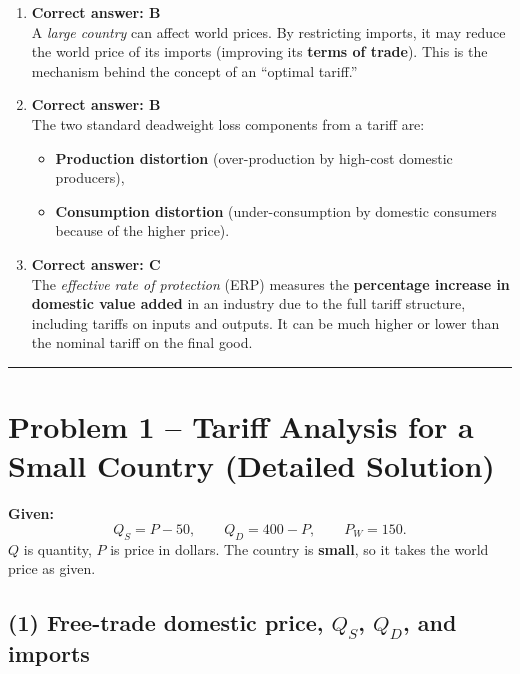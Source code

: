 \documentclass[12pt]{article}
\begin{document}
\begin{enumerate}[label=\textbf{\arabic*.}]
\item \textbf{Correct answer: B} \\
A \textit{large country} can affect world prices. By restricting imports, it may reduce the world price of its imports (improving its \textbf{terms of trade}).  
This is the mechanism behind the concept of an ``optimal tariff.''

\newpage

\item \textbf{Correct answer: B} \\
The two standard deadweight loss components from a tariff are:
\begin{itemize}
    \item \textbf{Production distortion} (over-production by high-cost domestic producers),
    \item \textbf{Consumption distortion} (under-consumption by domestic consumers because of the higher price).
\end{itemize}

\vspace{0.5em}

\item \textbf{Correct answer: C} \\
The \textit{effective rate of protection} (ERP) measures the \textbf{percentage increase in domestic value added} in an industry due to the full tariff structure, including tariffs on inputs and outputs.  
It can be much higher or lower than the nominal tariff on the final good.

\end{enumerate}

\vspace{1em}
\hrule
\vspace{1em}

\section*{Problem 1 – Tariff Analysis for a Small Country (Detailed Solution)}

\textbf{Given:}
\[
Q_S = P - 50, \qquad Q_D = 400 - P, \qquad P_W = 150.
\]
$Q$ is quantity, $P$ is price in dollars. The country is \textbf{small}, so it takes the world price as given.

\subsection*{(1) Free-trade domestic price, $Q_S$, $Q_D$, and imports}
\end{document}
